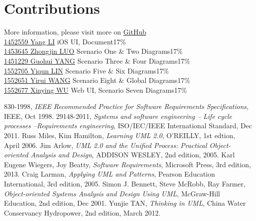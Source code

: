 \documentclass[12pt]{scrreprt}
\begin{document}
\chapter{Contributions}
More information, please visit more on \href{https://github.com/zjzsliyang/42003201ObjectOrientedAnalysisAndDesign}{GitHub}
\vspace{3mm}\\
\href{https://github.com/zjzsliyang}{{\color{blue}1452559 Yang LI}} \hspace{17mm} iOS UI, Document\hfill 17\%\\
\href{https://github.com/tjluozhongjin}{{\color{blue}1453645 Zhongjin LUO}} \hspace{5mm} Scenario One \& Two Diagrams\hfill 17\%\\
\href{https://github.com/Yghifi}{{\color{blue}1451229 Guohui YANG}} \hspace{4.5mm} Scenario Three \& Four Diagrams\hfill 17\%\\
\href{https://github.com/lyqun}{{\color{blue}1552705 Yiqun LIN}} \hspace{11mm} Scenario Five \& Six Diagrams\hfill 17\%\\
\href{https://github.com/Charon0622}{{\color{blue}1552651 Yirui WANG}} \hspace{7mm} Scenario Eight \& Global Diagrams\hfill 17\%\\
\href{https://github.com/CandiceGemini}{{\color{blue}1552677 Xinying WU}} \hspace{8mm} Web UI, Scenario Seven Diagrams\hfill 17\%

\begin{thebibliography}{99}
  830-1998,
  \emph{IEEE Recommended Practice for Software Requirements Specifications},
  IEEE,
  Oct 1998.
  29148-2011,
  \emph{Systems and software engineering -- Life cycle processes --Requirements engineering},
  ISO/IEC/IEEE International Standard,
  Dec 2011.
  Russ Miles, Kim Hamilton,
  \emph{Learning UML 2.0},
  O'REILLY,
  1st edtion,
  April 2006.
  Jim Arlow,
  \emph{UML 2.0 and the Unified Process: Practical Object-oriented Analysis and Design},
  ADDISON WESLEY,
  2nd edition,
  2005.
  Karl Eugene Wiegers, Joy Beatty,
  \emph{Software Requirements},
  Microsoft Press,
  3rd edition,
  2013.
  Craig Larman,
  \emph{Applying UML and Patterns},
  Pearson Education International,
  3rd edition,
  2005.
  Simon J. Bennett, Steve McRobb, Ray Farmer,
  \emph{Object-oriented Systems Analysis and Design Using UML},
  McGraw-Hill Education,
  2nd edition,
  Dec 2001.
  Yunjie TAN,
  \emph{Thinking in UML},
  China Water Conservancy Hydropower,
  2nd edition,
  March 2012.
\end{thebibliography}
\end{document}
